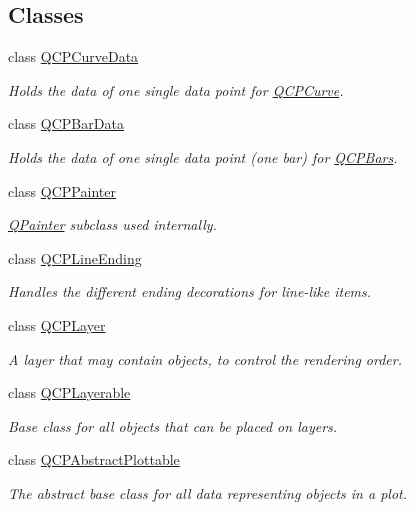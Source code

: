 \subsection*{Classes}
\begin{DoxyCompactItemize}
\item 
class \hyperlink{a00029}{Q\+C\+P\+Curve\+Data}
\begin{DoxyCompactList}\small\item\em Holds the data of one single data point for \hyperlink{a00028}{Q\+C\+P\+Curve}. \end{DoxyCompactList}\item 
class \hyperlink{a00026}{Q\+C\+P\+Bar\+Data}
\begin{DoxyCompactList}\small\item\em Holds the data of one single data point (one bar) for \hyperlink{a00027}{Q\+C\+P\+Bars}. \end{DoxyCompactList}\item 
class \hyperlink{a00047}{Q\+C\+P\+Painter}
\begin{DoxyCompactList}\small\item\em \hyperlink{a00060}{Q\+Painter} subclass used internally. \end{DoxyCompactList}\item 
class \hyperlink{a00046}{Q\+C\+P\+Line\+Ending}
\begin{DoxyCompactList}\small\item\em Handles the different ending decorations for line-\/like items. \end{DoxyCompactList}\item 
class \hyperlink{a00043}{Q\+C\+P\+Layer}
\begin{DoxyCompactList}\small\item\em A layer that may contain objects, to control the rendering order. \end{DoxyCompactList}\item 
class \hyperlink{a00044}{Q\+C\+P\+Layerable}
\begin{DoxyCompactList}\small\item\em Base class for all objects that can be placed on layers. \end{DoxyCompactList}\item 
class \hyperlink{a00024}{Q\+C\+P\+Abstract\+Plottable}
\begin{DoxyCompactList}\small\item\em The abstract base class for all data representing objects in a plot. \end{DoxyCompactList}\item 

\end{DoxyCompactItemize}
